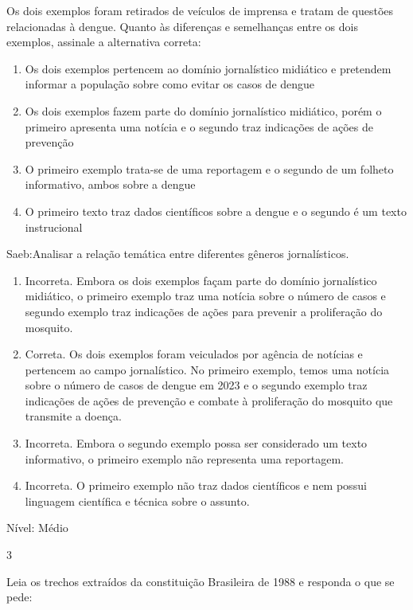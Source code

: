 {Os dois exemplos foram retirados de veículos de imprensa e tratam de
questões relacionadas à dengue. Quanto às diferenças e semelhanças entre
os dois exemplos, assinale a alternativa correta:

\begin{enumerate}
\def\labelenumi{\alph{enumi})}
\item
  Os dois exemplos pertencem ao domínio jornalístico midiático e
  pretendem informar a população sobre como evitar os casos de dengue
\item
  Os dois exemplos fazem parte do domínio jornalístico midiático, porém
  o primeiro apresenta uma notícia e o segundo traz indicações de ações
  de prevenção
\item
  O primeiro exemplo trata-se de uma reportagem e o segundo de um
  folheto informativo, ambos sobre a dengue
\item
  O primeiro texto traz dados científicos sobre a dengue e o segundo é
  um texto instrucional
\end{enumerate}

Saeb:Analisar a relação temática entre diferentes gêneros jornalísticos.

\begin{enumerate}
\def\labelenumi{\arabic{enumi}.}
\item
  Incorreta. Embora os dois exemplos façam parte do domínio jornalístico
  midiático, o primeiro exemplo traz uma notícia sobre o número de casos
  e segundo exemplo traz indicações de ações para prevenir a
  proliferação do mosquito.
\item
  Correta. Os dois exemplos foram veiculados por agência de notícias e
  pertencem ao campo jornalístico. No primeiro exemplo, temos uma
  notícia sobre o número de casos de dengue em 2023 e o segundo exemplo
  traz indicações de ações de prevenção e combate à proliferação do
  mosquito que transmite a doença.
\item
  Incorreta. Embora o segundo exemplo possa ser considerado um texto
  informativo, o primeiro exemplo não representa uma reportagem.
\item
  Incorreta. O primeiro exemplo não traz dados científicos e nem possui
  linguagem científica e técnica sobre o assunto.
\end{enumerate}

Nível: Médio

\num{3}

Leia os trechos extraídos da constituição Brasileira de 1988 e responda
o que se pede:

}
